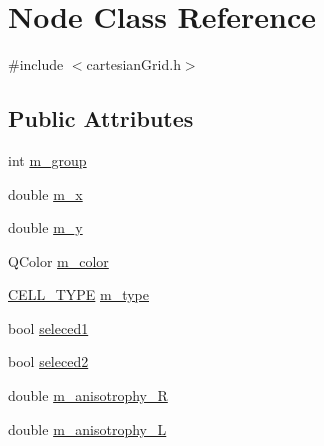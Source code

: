 \hypertarget{class_node}{\section{Node Class Reference}
\label{class_node}
}


{\ttfamily \#include $<$cartesian\+Grid.\+h$>$}

\subsection*{Public Attributes}
\begin{DoxyCompactItemize}
\item 
int \hyperlink{class_node_a3e068069e57916611009bddebafa47f1}{m\+\_\+group}
\item 
double \hyperlink{class_node_a4ffb0b48da3355f3600142d3bfff9516}{m\+\_\+x}
\item 
double \hyperlink{class_node_a380511589123d85c8d759c682abcb6de}{m\+\_\+y}
\item 
Q\+Color \hyperlink{class_node_a5663077fbe17bf9ee7615ae394f2981b}{m\+\_\+color}
\item 
\hyperlink{heart_defines_8h_a2f059cd81f362503874790462d535f5b}{C\+E\+L\+L\+\_\+\+T\+Y\+P\+E} \hyperlink{class_node_a0dd069dd1d5617c728bd5d836c80a9ce}{m\+\_\+type}
\item 
bool \hyperlink{class_node_abf67558672f9f1a459612a66ebe0d3e3}{seleced1}
\item 
bool \hyperlink{class_node_a9f83516dc28d2b4f894b466290b99d5f}{seleced2}
\item 
double \hyperlink{class_node_aee39dd0e84a95339084197716d3d2d40}{m\+\_\+anisotrophy\+\_\+\+R}
\item 
double \hyperlink{class_node_a5948b728ed6427c25cf64340b18b337d}{m\+\_\+anisotrophy\+\_\+\+L}
\end{DoxyCompactItemize}


